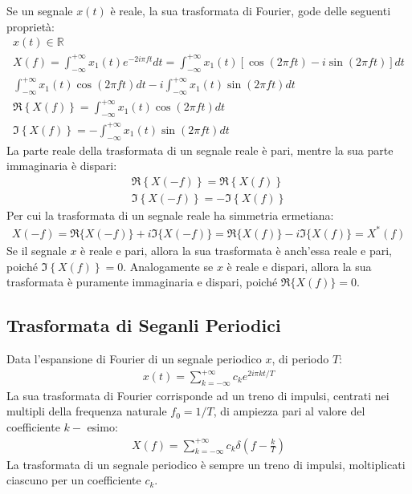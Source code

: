 \documentclass{article}
\numberwithin{equation}{subsection}
\begin{document}
Se un segnale $x(t)$ è reale, la sua trasformata di Fourier, gode delle seguenti proprietà:
\begin{gather*}
    x(t)\in\mathbb{R}\\
    X(f)=\displaystyle\int_{-\infty}^{+\infty}x_1(t)e^{-2i\pi ft}dt=\int_{-\infty}^{+\infty}x_1(t)\left[\cos(2\pi ft)-i\sin(2\pi ft)\right]dt\\
    \displaystyle\int_{-\infty}^{+\infty}x_1(t)\cos(2\pi ft)dt-i\int_{-\infty}^{+\infty}x_1(t)\sin(2\pi ft)dt\\
    \Re\left\{X(f)\right\}=\displaystyle\int_{-\infty}^{+\infty}x_1(t)\cos(2\pi ft)dt\\
    \Im\left\{X(f)\right\}=\displaystyle-\int_{-\infty}^{+\infty}x_1(t)\sin(2\pi ft)dt
\end{gather*}
La parte reale della trasformata di un segnale reale è pari, mentre la sua parte immaginaria è dispari:
\begin{gather*}
    \Re\left\{X(-f)\right\}=\Re\left\{X(f)\right\}\\
    \Im\left\{X(-f)\right\}=-\Im\left\{X(f)\right\}
\end{gather*}
Per cui la trasformata di un segnale reale ha simmetria ermetiana:
\begin{gather*}
    X(-f)=\Re\{X(-f)\}+i\Im\{X(-f)\}=\Re\{X(f)\}-i\Im\{X(f)\}=X^*(f)
\end{gather*}
Se il segnale $x$ è reale e pari, allora la sua trasformata è anch'essa reale e pari, poiché $\Im\left\{X(f)\right\}=0$. 
Analogamente se $x$ è reale e dispari, allora la sua trasformata è puramente immaginaria e dispari, poiché $\Re\{X(f)\}=0$. 

\subsection{Trasformata di Seganli Periodici}

Data l'espansione di Fourier di un segnale periodico $x$, di periodo $T$:
\begin{gather*}
    x(t)=\displaystyle\sum_{k=-\infty}^{+\infty}c_ke^{2i\pi kt/T}
\end{gather*}
La sua trasformata di Fourier corrisponde ad un treno di impulsi, centrati nei multipli della frequenza naturale $f_0=1/T$, di ampiezza pari al valore del coefficiente $k-$
esimo: 
\begin{gather*}
    X(f)=\displaystyle\sum_{k=-\infty}^{+\infty}c_k\delta\left(f-\frac{k}{T}\right)
\end{gather*}
La trasformata di un segnale periodico è sempre un treno di impulsi, moltiplicati ciascuno per un coefficiente $c_k$.
\end{document}
